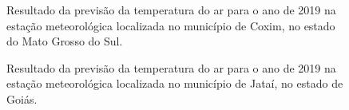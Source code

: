 \begin{figure}[H]%
\caption{Resultado da previsão da temperatura do ar para o ano de 2019 na estação meteorológica localizada no município de Coxim, no estado do Mato Grosso do Sul.}
\centering
{}
\qquad
{}
\label{fig:results_arima_A720}%
\end{figure}

\begin{figure}[H]%
\caption{Resultado da previsão da temperatura do ar para o ano de 2019 na estação meteorológica localizada no município de Jataí, no estado de Goiás.}
\centering
{}
\qquad
{}
\label{fig:results_lstm_83464}%
\end{figure}

